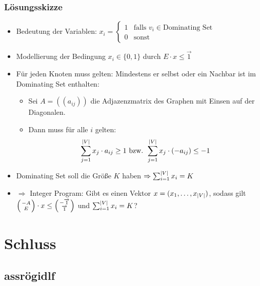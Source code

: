 \begin{frame}
	\frametitle{Lösungsskizze}
	
	\begin{itemize}
		\item Bedeutung der Variablen: $x_i = \begin{cases} 1 & \text{falls } v_i \in \text{Dominating Set} \\ 0 & \text{sonst} \end{cases}$ %
		\item Modellierung der Bedingung $x_i \in \{0,1\}$ durch $E \cdot x \leq \overrightarrow{1}$
		\item Für jeden Knoten muss gelten: Mindestens er selbst oder ein Nachbar ist im Dominating Set enthalten:
		\begin{itemize}
			\item Sei $A = ((a_{ij}))$ die Adjazenzmatrix des Graphen mit Einsen auf der Diagonalen.
			\item Dann muss für alle $i$ gelten: $$\sum_{j=1}^{\left\vert V \right\vert} x_j \cdot a_{ij} \geq 1 \text { bzw. } \sum_{j=1}^{\left\vert V \right\vert} x_j \cdot (-a_{ij}) \leq -1 $$
		\end{itemize}
		\item Dominating Set soll die Größe $K$ haben $\Rightarrow \sum_{i=1}^{\left\vert V \right\vert} x_i = K$		
		\item $\Rightarrow$ Integer Program: Gibt es einen Vektor $x = (x_1, \ldots, x_{\left\vert V \right\vert})$, sodass gilt $\left( {-A} \atop E \right) \cdot x \leq \left( {-\overrightarrow{1}} \atop {\overrightarrow{1}} \right)$ und $\sum_{i=1}^{\left\vert V \right\vert} x_i = K$?
	\end{itemize}
\end{frame}

\section{Schluss}
\subsection{assrögidlf}

